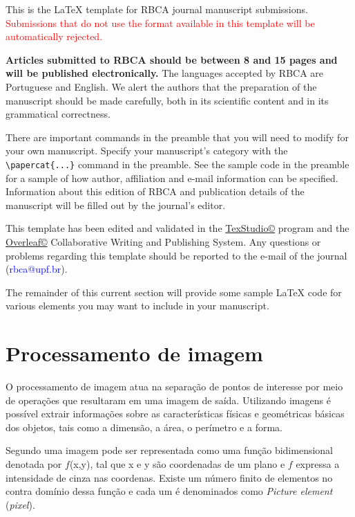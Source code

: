 \documentclass[a4paper,alpha-refs]{RBCA_v1.0}
\begin{document}
This is the \LaTeX{} template for RBCA journal manuscript submissions. \textcolor{red}{Submissions that do not use the format available in this template will be automatically rejected.} 

\textbf{Articles submitted to RBCA should be between 8 and 15 pages and will be published electronically.} The languages accepted by RBCA are Portuguese and English. We alert the authors that the preparation of the manuscript should be made carefully, both in its scientific content and in its grammatical correctness.

There are important commands in the preamble that you will need to modify for your own manuscript. Specify your manuscript's category with the \verb|\papercat{...}| command in the preamble. See the sample code in the preamble for a sample of how author, affiliation and e-mail information can be specified. Information about this edition of RBCA and publication details of the manuscript will be filled out by the journal's editor.

This template has been edited and validated in the \href{http://www.texstudio.org/}{TexStudio\copyright} program and the \href{https://www.overleaf.com/}{Overleaf\copyright} Collaborative Writing and Publishing System. Any questions or problems regarding this template should be reported to the e-mail of the journal (\textcolor{blue}{rbca@upf.br}).

The remainder of this current section will provide some sample \LaTeX{} code for various elements you may want to include in your manuscript.

\section{Processamento de imagem}

O processamento de imagem atua na separação de pontos de interesse por meio de operações que resultaram em uma imagem de saída. Utilizando imagens é possível extrair informações sobre as características físicas e geométricas básicas dos objetos, tais como a dimensão, a área, o perímetro e a forma.
 
Segundo \cite{ProcDigital} uma imagem pode ser representada como uma função bidimensional denotada por $f$(x,y), tal que x e y são coordenadas de um plano e $f$ expressa a intensidade de cinza nas coordenas. Existe um número finito de elementos no contra domínio dessa função e cada um é denominados como \textit{Picture element} (\textit{pixel}).
\end{document}
